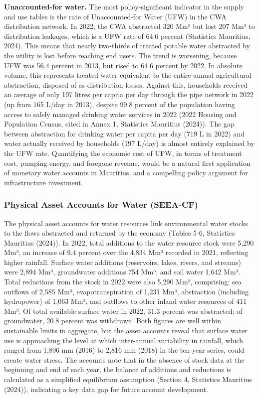 \documentclass[
  letterpaper,
  DIV=11,
  numbers=noendperiod]{scrartcl}
\begin{document}
\textbf{Unaccounted-for water.} The most policy-significant indicator in
the supply and use tables is the rate of Unaccounted-for Water (UFW) in
the CWA distribution network. In 2022, the CWA abstracted 320 Mm³ but
lost 207 Mm³ to distribution leakages, which is a UFW rate of 64.6
percent (Statistics Mauritius, 2024). This means that nearly two-thirds
of treated potable water abstracted by the utility is lost before
reaching end users. The trend is worsening, because UFW was 56.4 percent
in 2013, but rised to 64.6 percent by 2022. In absolute volume, this
represents treated water equivalent to the entire annual agricultural
abstraction, disposed of as distribution losses. Against this,
households received an average of only 197 litres per capita per day
through the pipe network in 2022 (up from 165 L/day in 2013), despite
99.8 percent of the population having access to safely managed drinking
water services in 2022 (2022 Housing and Population Census, cited in
Annex 1, Statistics Mauritius (2024)). The gap between abstraction for
drinking water per capita per day (719 L in 2022) and water actually
received by households (197 L/day) is almost entirely explained by the
UFW rate. Quantifying the economic cost of UFW, in terms of treatment
cost, pumping energy, and foregone revenue, would be a natural first
application of monetary water accounts in Mauritius, and a compelling
policy argument for infrastructure investment.

\subsubsection{Physical Asset Accounts for Water
(SEEA-CF)}\label{physical-asset-accounts-for-water-seea-cf}

The physical asset accounts for water resources link environmental water
stocks to the flows abstracted and returned by the economy (Tables 5-6,
Statistics Mauritius (2024)). In 2022, total additions to the water
resource stock were 5,290 Mm³, an increase of 9.4 percent over the 4,834
Mm³ recorded in 2021, reflecting higher rainfall. Surface water
additions (reservoirs, lakes, rivers, and streams) were 2,894 Mm³,
groundwater additions 754 Mm³, and soil water 1,642 Mm³. Total
reductions from the stock in 2022 were also 5,290 Mm³, comprising: sea
outflows of 2,585 Mm³, evapotranspiration of 1,231 Mm³, abstraction
(including hydropower) of 1,063 Mm³, and outflows to other inland water
resources of 411 Mm³. Of total available surface water in 2022, 31.3
percent was abstracted; of groundwater, 20.8 percent was withdrawn. Both
figures are well within sustainable limits in aggregate, but the asset
accounts reveal that surface water use is approaching the level at which
inter-annual variability in rainfall, which ranged from 1,896 mm (2016)
to 2,816 mm (2018) in the ten-year series, could create water stress.
The accounts note that in the absence of stock data at the beginning and
end of each year, the balance of additions and reductions is calculated
as a simplified equilibrium assumption (Section 4, Statistics Mauritius
(2024)), indicating a key data gap for future account development.
\end{document}
